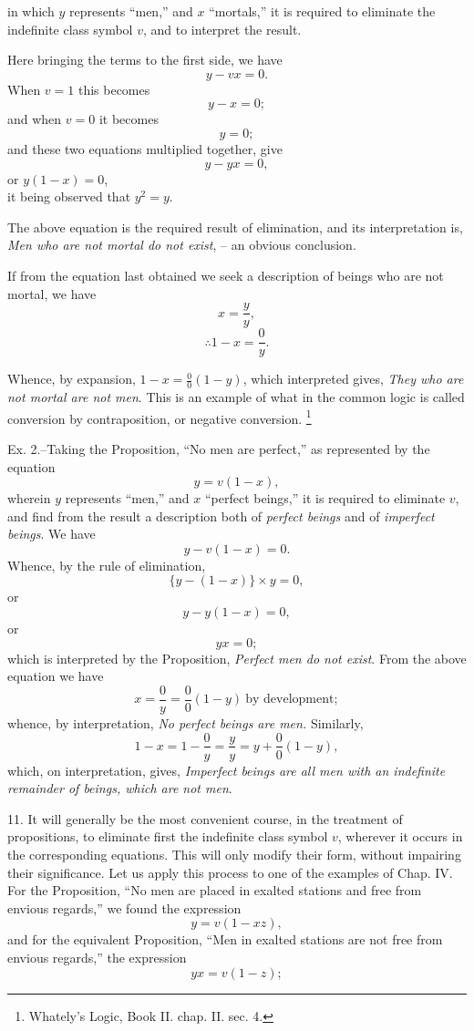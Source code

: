 \documentclass[oneside]{book}
\begin{document}
in which $y$ represents ``men,'' and $x$ ``mortals,'' it is required to
eliminate the indefinite class symbol $v$, and to interpret the
result.

Here bringing the terms to the first side, we have
\[
y - vx = 0.
\]
When $v = 1$ this becomes
\[
y - x = 0;
\]
and when $v = 0$ it becomes
\[
y = 0;
\]
and these two equations multiplied together, give
\[
y - yx = 0,
\]
or $y(1 - x) = 0$, \\
it being observed that $y^2 = y$.

The above equation is the required result of elimination, and
its interpretation is, \textit{Men who are not mortal do not exist}, -- an obvious conclusion.

If from the equation last obtained we seek a description of
beings who are not mortal, we have
\[
x = \frac{y}{y},
\]
\[
\therefore 1 - x = \frac{0}{y}.
\]

Whence, by expansion, $1 - x = \frac{0}{0}(1 - y)$, which interpreted gives,
\textit{They who are not mortal are not men}. This is an example of
what in the common logic is called conversion by contraposition,
or negative conversion.
\footnote{Whately's Logic, Book II. chap. II. sec. 4.}

Ex. 2.--Taking the Proposition, ``No men are perfect,'' as
represented by the equation
\[
     y = v(1-x),
\]
wherein $y$ represents ``men,'' and $x$ ``perfect beings,'' it is required
to eliminate $v$, and find from the result a description both
of \textit{perfect beings} and of \textit{imperfect beings}. We have
\[
     y-v(1-x) = 0.
\]
Whence, by the rule of elimination,
\[
     \{y-(1-x)\}\times y = 0,
\]
or
\[
     y-y(1-x) = 0,
\]
or
\[
     yx = 0;
\]
which is interpreted by the Proposition, \textit{Perfect men do not exist}.
From the above equation we have
\[
     x = \frac{0}{y} = \frac{0}{0}(1-y)\:\textrm{by development};
\]
whence, by interpretation, \textit{No perfect beings are men.} Similarly,
\[
     1-x = 1-\frac{0}{y} = \frac{y}{y} = y+\frac{0}{0}(1-y),
\]
which, on interpretation, gives, \textit{Imperfect beings are all men
with an indefinite remainder of beings, which are not men}.

11. It will generally be the most convenient course, in the
treatment of propositions, to eliminate first the indefinite class
symbol $v$, wherever it occurs in the corresponding equations.
This will only modify their form, without impairing their significance.
Let us apply this process to one of the examples of
Chap. IV. For the Proposition, ``No men are placed in exalted
stations and free from envious regards,'' we found the expression
\[
     y = v(1-xz),
\]
and for the equivalent Proposition, ``Men in exalted stations are
not free from envious regards,'' the expression
\[
     yx = v(1-z);
\]
\end{document}

